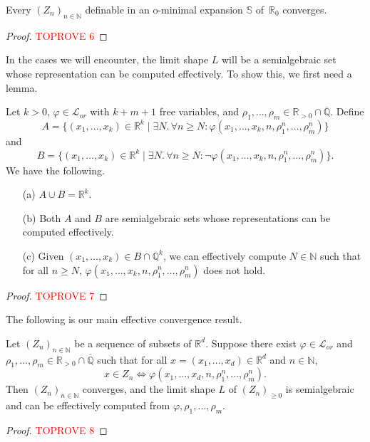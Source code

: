 \documentclass[a4paper,UKenglish,cleveref]{lipics-v2021}
\newcommand{\nat}{\mathbb{N}}
\newcommand{\rel}{\mathbb{R}}
\newcommand{\rat}{\mathbb{Q}}
\newcommand{\alg}{\overline{\rat}}
\newcommand{\Lcal}{\mathcal{L}}
\newcommand{\Sb}{\mathbb{S}}
\newcommand{\seq}[1]{(#1)_{n \in \mathbb{N}}}
\begin{document}
\begin{theorem}
	\label{thm:limshape}
	Every $(Z_n)_{n \in \nat}$ definable in an o-minimal expansion $\Sb$ of~$\rel_0$ converges.
\end{theorem}
\begin{proof}\textcolor{red}{TOPROVE 6}\end{proof}

In the cases we will encounter, the limit shape $L$ will be a semialgebraic set whose representation can be computed effectively.
To show this, we first need a lemma.


\begin{lemma}
	\label{thm:omin-effective}
	Let $k > 0$, $\varphi \in \Lcal_{or}$ with $k+m+1$ free variables, and $\rho_1,\ldots,\rho_m \in \rel_{>0} \cap  \alg$.
	Define
	\[
	A = \{(x_1,\ldots,x_k) \in \rel^{k} \mid \exists N.\, \forall n \ge N \colon \varphi(x_1,\ldots,x_k, n,  \rho_1^n, \ldots, \rho_m^n)\}
	\] and 
	\[
	B = \{(x_1,\ldots,x_k) \in \rel^{k} \mid \exists N.\, \forall n \ge N \colon \lnot\varphi(x_1,\ldots,x_k, n,  \rho_1^n, \ldots, \rho_m^n)\}.
	\]
	We have the following.
	\begin{enumerate}
		\item[(a)] $A \cup B = \rel^{k}$.
		\item[(b)] Both $A$ and $B$ are semialgebraic sets whose representations can be computed effectively.
		\item[(c)] Given $(x_1,\ldots,x_k )\in B \cap \rat^{k}$, we can effectively compute $N \in \nat$ such that  for all $n \ge N$, $\varphi(x_1,\ldots,x_k, n, \rho_1^n,\ldots,\rho_m^n)$ does not hold.
	\end{enumerate}
\end{lemma}
\begin{proof}\textcolor{red}{TOPROVE 7}\end{proof}

The following is our main effective convergence result.

\begin{lemma}
	\label{thm:omin-effective-2}
	Let $(Z_n)_{n \in \nat}$ be a sequence of subsets of $\rel^d$.
	Suppose there exist $\varphi \in \Lcal_{or}$ and $\rho_1,\ldots,\rho_m \in \rel_{>0} \cap \alg$ such that for all $x = (x_1,\ldots,x_d) \in \rel^d$ and $n \in \nat$,
	\begin{equation}
		\label{eq:thm:scaling-matrices-lim-shape-1}
		x \in Z_n \Leftrightarrow \varphi(x_1,\ldots,x_d, n, \rho_1^n,\ldots,\rho_m^n).
	\end{equation}
	Then $\seq{Z_n}$ converges, and the limit shape $L$ of $(Z_n)_{\ge 0}$ is semialgebraic and can be effectively computed from $\varphi, \rho_1,\ldots,\rho_m$.
\end{lemma}
\begin{proof}\textcolor{red}{TOPROVE 8}\end{proof}
\end{document}
